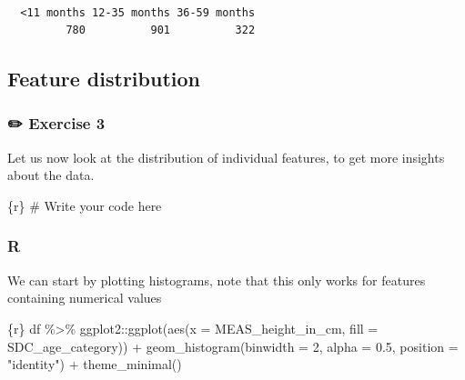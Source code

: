 \documentclass[
  letterpaper,
  DIV=11,
  numbers=noendperiod,
  oneside]{scrreprt}
\newenvironment{Shaded}{\begin{snugshade}}{\end{snugshade}}
\newcommand{\AttributeTok}[1]{\textcolor[rgb]{0.40,0.45,0.13}{#1}}
\newcommand{\CommentTok}[1]{\textcolor[rgb]{0.37,0.37,0.37}{#1}}
\newcommand{\DecValTok}[1]{\textcolor[rgb]{0.68,0.00,0.00}{#1}}
\newcommand{\FloatTok}[1]{\textcolor[rgb]{0.68,0.00,0.00}{#1}}
\newcommand{\FunctionTok}[1]{\textcolor[rgb]{0.28,0.35,0.67}{#1}}
\newcommand{\InformationTok}[1]{\textcolor[rgb]{0.37,0.37,0.37}{#1}}
\newcommand{\NormalTok}[1]{\textcolor[rgb]{0.00,0.23,0.31}{#1}}
\newcommand{\SpecialCharTok}[1]{\textcolor[rgb]{0.37,0.37,0.37}{#1}}
\newcommand{\StringTok}[1]{\textcolor[rgb]{0.13,0.47,0.30}{#1}}
\begin{document}
\begin{verbatim}

  <11 months 12-35 months 36-59 months 
         780          901          322 
\end{verbatim}

\hypertarget{feature-distribution}{%
\subsection{Feature distribution}\label{feature-distribution}}

\hypertarget{exercise-3-3}{%
\subsubsection{\texorpdfstring{{✏️} Exercise
3}{✏️ Exercise 3}}\label{exercise-3-3}}

Let us now look at the distribution of individual features, to get more
insights about the data.

\begin{Shaded}
\begin{Highlighting}[]
\InformationTok{\textasciigrave{}\textasciigrave{}\textasciigrave{}\{r\}}
\CommentTok{\# Write your code here}
\InformationTok{\textasciigrave{}\textasciigrave{}\textasciigrave{}}
\end{Highlighting}
\end{Shaded}

\hypertarget{r-14}{%
\subsubsection{R}\label{r-14}}

We can start by plotting histograms, note that this only works for
features containing numerical values

\begin{Shaded}
\begin{Highlighting}[]
\InformationTok{\textasciigrave{}\textasciigrave{}\textasciigrave{}\{r\}}
\NormalTok{df }\SpecialCharTok{\%\textgreater{}\%}\NormalTok{  ggplot2}\SpecialCharTok{::}\FunctionTok{ggplot}\NormalTok{(}\FunctionTok{aes}\NormalTok{(}\AttributeTok{x =}\NormalTok{ MEAS\_height\_in\_cm,}
                            \AttributeTok{fill =}\NormalTok{ SDC\_age\_category)) }\SpecialCharTok{+}
  \FunctionTok{geom\_histogram}\NormalTok{(}\AttributeTok{binwidth =} \DecValTok{2}\NormalTok{, }\AttributeTok{alpha =} \FloatTok{0.5}\NormalTok{, }\AttributeTok{position =} \StringTok{"identity"}\NormalTok{) }\SpecialCharTok{+}
  \FunctionTok{theme\_minimal}\NormalTok{()}
\InformationTok{\textasciigrave{}\textasciigrave{}\textasciigrave{}}
\end{Highlighting}
\end{Shaded}
\end{document}
